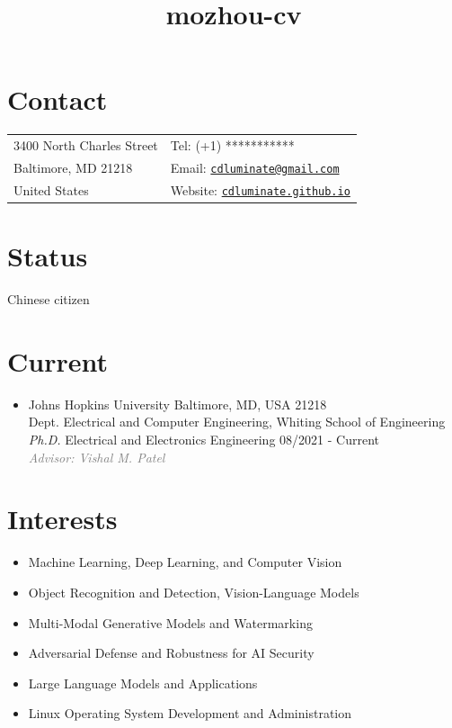 \documentclass[10pt,margin,line,pifont,palatino,courier]{res}
\newcommand{\email}[1]{\href{mailto:#1}{\tt #1}}
\begin{document}
\title{mozhou-cv}
\begin{resume}

\section{\sc Contact}

\vspace{.05in}
\begin{tabular}{@{}p{2.2in}p{2.2in}}
3400 North Charles Street & Tel: (+1) *********** \\
Baltimore, MD 21218       & Email: \email{cdluminate@gmail.com}\\
United States	          & Website: \href{https://cdluminate.github.io/}{\tt cdluminate.github.io}
\end{tabular}

\section{\sc Status}
Chinese citizen

\section{\sc Current}

\begin{itemize}[leftmargin=*]
\item Johns Hopkins University \hfill Baltimore, MD, USA 21218\\
    Dept. Electrical and Computer Engineering, Whiting School of Engineering\\
	\textit{Ph.D.} Electrical and Electronics Engineering \hfill 08/2021 - Current\\
    \textcolor{gray}{\small\it Advisor: Vishal M. Patel}
\end{itemize}

\section{\sc Interests}
\begin{itemize}[noitemsep, leftmargin=*]
	\item Machine Learning, Deep Learning, and Computer Vision
	\item Object Recognition and Detection, Vision-Language Models
    \item Multi-Modal Generative Models and Watermarking
	\item Adversarial Defense and Robustness for AI Security
    \item Large Language Models and Applications
	\item Linux Operating System Development and Administration
\end{itemize}
 

\end{resume}
\end{document}
